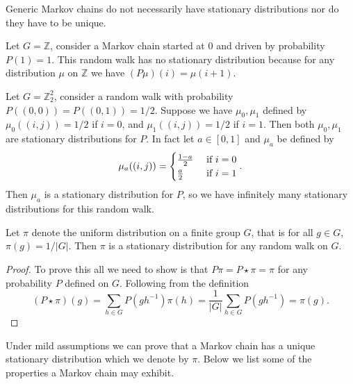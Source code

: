 \documentclass[11pt]{report}
\begin{document}
Generic Markov chains do not necessarily have stationary distributions nor do they have to be unique.
\begin{example}
	Let $G = \mathbb{Z}$, consider a Markov chain started 
	at $0$ and driven by probability $P(1) =1 $. This random walk has no stationary distribution because for 
	any distribution $\mu$ on $\mathbb{Z}$ we have $( P \mu)(i) = \mu(i+1)$.
	
	Let $G= \mathbb{Z}_{2}^{2}$, consider a random walk with probability 
	$P((0,0)) = P((0,1)) = 1/2$. Suppose we have $\mu_{0},\mu_{1}$ defined by 
	$\mu_{0}((i,j)) = 1/2$ if $i=0$, and $\mu_{1}((i,j))= 
	1/2$ if $i=1$. Then both $\mu_{0},\mu_{1}$ are stationary distributions for 
	$P$. In fact let $a \in [0,1]$ and $\mu_{a}$ be defined by
	\[\mu_{a}((i,j)) = \begin{cases}
	\frac{1-a}{2} & \textnormal{ if } i=0\\
	\frac{a}{2} & \textnormal{ if } i=1 
	\end{cases}.\]
	Then $\mu_{a}$  is a stationary distribution for $P$, so we have infinitely many stationary distributions for this random walk.
	
	
	
	
	
	
	
	
	
	
	
\end{example}

\begin{lemma}
	\label{chpt2:lem:uniform}
	Let $\pi$ denote the uniform distribution on a finite group $G$, that is for all $g \in G$,  
	$\pi(g) = 1/|G|$. Then $\pi$ is a stationary distribution for any random walk on $G$.
\end{lemma}

\begin{proof}
	To prove this all we need to show is that $P \pi = P \star \pi = \pi$ for any probability $P$ defined on $G$. 
	Following from the definition
	\[(P \star \pi)(g) = \sum_{h \in G} P(gh^{-1}) \pi(h) 
	=\frac{1}{|G|}\sum_{h\in G} P(gh^{-1}) = \pi(g) .\]
\end{proof}


Under mild assumptions we can prove that a Markov chain has a unique stationary 
distribution which we denote by $\pi$. Below we list some of the 
properties a Markov chain may exhibit. 
\end{document}
